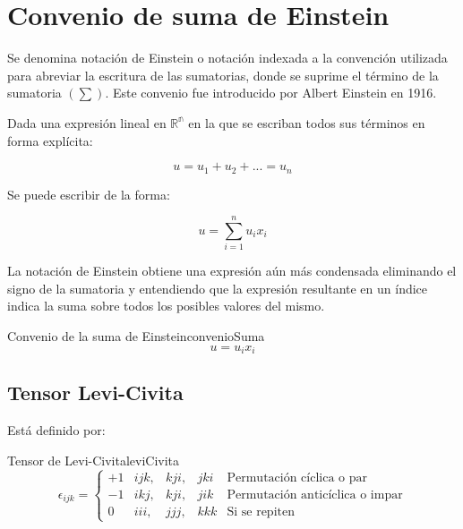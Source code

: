 
\section*{Convenio de suma de Einstein}

Se denomina notación de Einstein o notación indexada a la convención utilizada
para abreviar la escritura de las sumatorias, donde se suprime el término de la
sumatoria $(\sum)$. Este convenio fue introducido por Albert Einstein en 1916.

Dada una expresión lineal en $\mathbb{R^n}$ en la que se escriban todos sus
términos en forma explícita:

\begin{equation}
    u = u_1 + u_2 + ... = u_n
\end{equation}

Se puede escribir de la forma:

\begin{equation}
    u = \sum_{i=1}^{n} u_ix_i
\end{equation}

La notación de Einstein obtiene una expresión aún más condensada eliminando el
signo de la sumatoria y entendiendo que la expresión resultante en un índice
indica la suma sobre todos los posibles valores del mismo.

\begin{theorem}{Convenio de la suma de Einstein}{convenioSuma}
    \begin{equation}
        u = u_ix_i
    \end{equation}
\end{theorem}

\subsection*{Tensor Levi-Civita}

Está definido por:

\begin{theorem}{Tensor de Levi-Civita}{leviCivita}
\begin{equation}
    \epsilon_{ijk}=
    \left\lbrace\begin{array}{ccccl} 
        +1 & ijk, & kji, & jki & \text{Permutación cíclica o par}\\ 
        -1 & ikj, & kji, & jik & \text{Permutación anticíclica o impar}\\
        0  & iii, & jjj, & kkk & \text{Si se repiten}
    \end{array}\right.
\end{equation}
\end{theorem}

